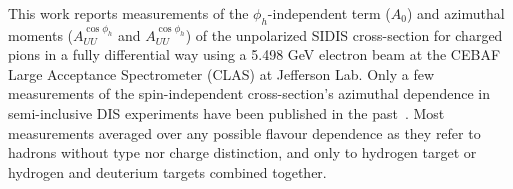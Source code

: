 \documentclass[aps,prl,twocolumn,showpacs,superscriptaddress,groupedaddress]{revtex4-1}  %
\begin{document}
This work reports measurements of the $\phi_h$-independent term ($A_0$) and azimuthal moments ($A^{\cos \phi_h}_{UU}$ and $A^{\cos \phi_h}_{UU}$) of the unpolarized SIDIS cross-section for charged pions in a fully differential way using a 5.498 GeV electron beam at the CEBAF Large Acceptance Spectrometer (CLAS) \cite{Mecking:2003zu} at Jefferson Lab.
Only a few measurements of the spin-independent cross-section's azimuthal dependence in semi-inclusive DIS experiments have been published in the past~\cite{Aubert:1983cz,Arneodo:1986cf,Adams:1993hs,Breitweg:2000qh}.
Most measurements averaged over any possible flavour dependence as they refer to hadrons without type nor charge distinction, and only to hydrogen target or hydrogen and deuterium targets combined together.

\end{document}
